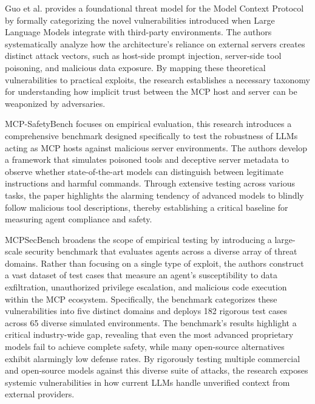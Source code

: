 


Guo et al. \cite{guo2025systematic}
provides a foundational threat model for the Model Context Protocol by formally categorizing the novel vulnerabilities introduced when Large Language Models integrate with third-party environments. The authors systematically analyze how the architecture's reliance on external servers creates distinct attack vectors, such as host-side prompt injection, server-side tool poisoning, and malicious data exposure. By mapping these theoretical vulnerabilities to practical exploits, the research establishes a necessary taxonomy for understanding how implicit trust between the MCP host and server can be weaponized by adversaries.

MCP-SafetyBench \cite{zong2025mcp} focuses on empirical evaluation, this research introduces a comprehensive benchmark designed specifically to test the robustness of LLMs acting as MCP hosts against malicious server environments. The authors develop a framework that simulates poisoned tools and deceptive server metadata to observe whether state-of-the-art models can distinguish between legitimate instructions and harmful commands. Through extensive testing across various tasks, the paper highlights the alarming tendency of advanced models to blindly follow malicious tool descriptions, thereby establishing a critical baseline for measuring agent compliance and safety.

MCPSecBench \cite{yang2025mcpsecbench} broadens the scope of empirical testing by introducing a large-scale security benchmark that evaluates agents across a diverse array of threat domains. Rather than focusing on a single type of exploit, the authors construct a vast dataset of test cases that measure an agent’s susceptibility to data exfiltration, unauthorized privilege escalation, and malicious code execution within the MCP ecosystem. Specifically, the benchmark categorizes these vulnerabilities into five distinct domains and deploys 182 rigorous test cases across 65 diverse simulated environments. The benchmark's results highlight a critical industry-wide gap, revealing that even the most advanced proprietary models fail to achieve complete safety, while many open-source alternatives exhibit alarmingly low defense rates. By rigorously testing multiple commercial and open-source models against this diverse suite of attacks, the research exposes systemic vulnerabilities in how current LLMs handle unverified context from external providers.


